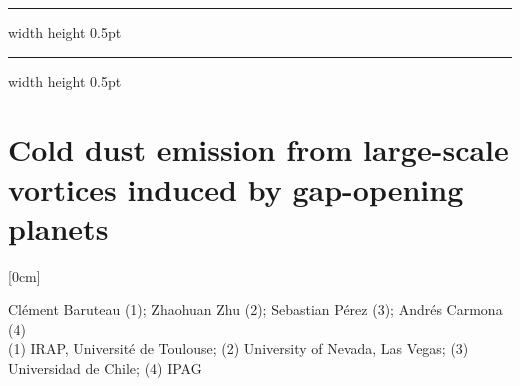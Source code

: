 \documentclass[a4paper,11pt]{book}
\def\doubleline{
\hrule width \hsize height 0.5pt  \kern 1mm \hrule width \hsize height 0.5pt 
}
\begin{document}
\noindent\doubleline
        
          \section[Cold dust emission from large-scale vortices induced by gap-opening planets \newline(Clément Baruteau)] { Cold dust emission from large-scale vortices induced by gap-opening planets }



[0cm]



\begin{center}
    
{\large Clément Baruteau (1)};{ \large  Zhaohuan Zhu (2)};{ \large  Sebastian Pérez (3)};{ \large  Andrés Carmona (4)}\\
  
\vspace{2 mm}
\noindent (1) IRAP, Université de Toulouse; (2)  University of Nevada, Las Vegas; (3)  Universidad de Chile; (4)  IPAG\\

\end{center}



  
\end{document}
